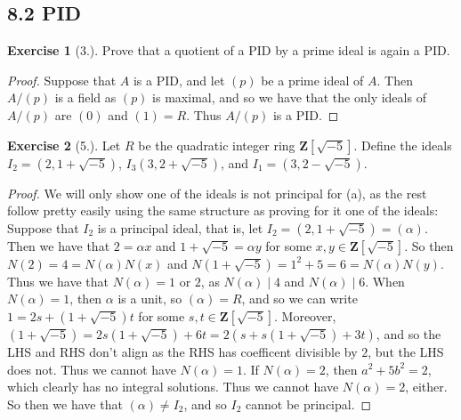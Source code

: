 \documentclass[9pt,reqno]{amsart}
\theoremstyle{definition}
\newtheorem{exercise}{Exercise}[section]
\newcommand{\zz}{\mathbf Z}
\begin{document}
\subsection{8.2 PID}
\begin{exercise}[3.] 
	Prove that a quotient of a PID by a prime ideal is again a PID.
\end{exercise}
\begin{proof}
	Suppose that $A$ is a PID, and let $(p)$ be a prime ideal of $A$. Then $A/(p)$ is a field as $(p)$ is maximal, and so we have that the only ideals of $A/(p)$ are $(0)$ and $(1) = R$. Thus $A/(p)$ is a PID. 
\end{proof}
\begin{exercise}[5.]
	Let $R$ be the quadratic integer ring $\zz[\sqrt{-5}]$. Define the ideals $I_2 = (2, 1+ \sqrt{-5})$, $I_3(3, 2+\sqrt{-5})$, and $I_1 = (3, 2-\sqrt{-5})$.
	\begin{proof}
		We will only show one of the ideals is not principal for (a), as the rest follow pretty easily using the same structure as proving for it one of the ideals: Suppose that $I_2$ is a principal ideal, that is, let $I_2 = (2, 1+ \sqrt{-5})= (\alpha) $. Then we have that $2 = \alpha x$ and $1+ \sqrt{-5} = \alpha y$ for some $x, y \in \zz[\sqrt{-5}]$. So then $N(2) = 4 = N(\alpha ) N(x)$ and $N(1+\sqrt{-5}) = 1^2 + 5 = 6 =   N(\alpha) N(y) $. Thus we have that $N (\alpha) = 1$ or $2$, as $N(\alpha) \mid 4$ and $N (\alpha) \mid 6$. When $N(\alpha) = 1$, then $\alpha$ is a unit, so $(\alpha) = R$, and so we can write $1 = 2s + (1+\sqrt{-5})t$ for some $s, t \in \zz[\sqrt{-5}]$. Moreover, $(1+\sqrt{-5}) = 2s(1+ \sqrt{-5}) + 6t = 2(s+s(1+\sqrt{-5}) + 3t)$, and so the LHS and RHS don't align as the RHS has coefficent divisible by $2$, but the LHS does not. Thus we cannot have $N(\alpha) = 1$. If $N(\alpha) = 2$, then $a^2 + 5 b^2 = 2$, which clearly has no integral solutions. Thus we cannot have $N(\alpha) = 2$, either. So then we have that $(\alpha) \neq I_2$, and so $I_2$ cannot be principal.
	\end{proof}
\end{exercise}
\end{document}
